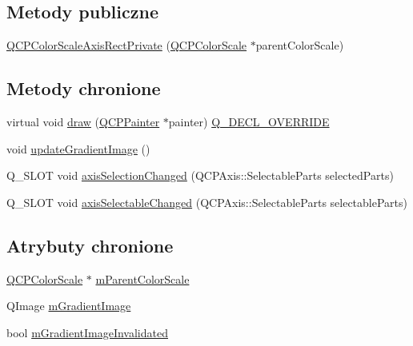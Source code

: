 \subsection*{Metody publiczne}
\begin{DoxyCompactItemize}
\item 
\hyperlink{class_q_c_p_color_scale_axis_rect_private_ad3b242f75dd2b33581364a4e668a80db}{Q\+C\+P\+Color\+Scale\+Axis\+Rect\+Private} (\hyperlink{class_q_c_p_color_scale}{Q\+C\+P\+Color\+Scale} $\ast$parent\+Color\+Scale)
\end{DoxyCompactItemize}
\subsection*{Metody chronione}
\begin{DoxyCompactItemize}
\item 
virtual void \hyperlink{class_q_c_p_color_scale_axis_rect_private_a52a21c7cbe086cd587c955cfe6e25e3b}{draw} (\hyperlink{class_q_c_p_painter}{Q\+C\+P\+Painter} $\ast$painter) \hyperlink{qcustomplot_8hh_a42cc5eaeb25b85f8b52d2a4b94c56f55}{Q\+\_\+\+D\+E\+C\+L\+\_\+\+O\+V\+E\+R\+R\+I\+DE}
\item 
void \hyperlink{class_q_c_p_color_scale_axis_rect_private_a73754cab312aeaddea1bfcc67cc079ac}{update\+Gradient\+Image} ()
\item 
Q\+\_\+\+S\+L\+OT void \hyperlink{class_q_c_p_color_scale_axis_rect_private_a6112ad4291ac1695d37659cb049d598d}{axis\+Selection\+Changed} (Q\+C\+P\+Axis\+::\+Selectable\+Parts selected\+Parts)
\item 
Q\+\_\+\+S\+L\+OT void \hyperlink{class_q_c_p_color_scale_axis_rect_private_a66d2baed86966bb03a6d7c32dc7d59f7}{axis\+Selectable\+Changed} (Q\+C\+P\+Axis\+::\+Selectable\+Parts selectable\+Parts)
\end{DoxyCompactItemize}
\subsection*{Atrybuty chronione}
\begin{DoxyCompactItemize}
\item 
\hyperlink{class_q_c_p_color_scale}{Q\+C\+P\+Color\+Scale} $\ast$ \hyperlink{class_q_c_p_color_scale_axis_rect_private_a311c73f51a4cb0b556388197833cf099}{m\+Parent\+Color\+Scale}
\item 
Q\+Image \hyperlink{class_q_c_p_color_scale_axis_rect_private_ad4f7c8ee1c6012d9950870811773119c}{m\+Gradient\+Image}
\item 
bool \hyperlink{class_q_c_p_color_scale_axis_rect_private_a2c0b15b071e1f93006b48b5be022a631}{m\+Gradient\+Image\+Invalidated}
\end{DoxyCompactItemize}
